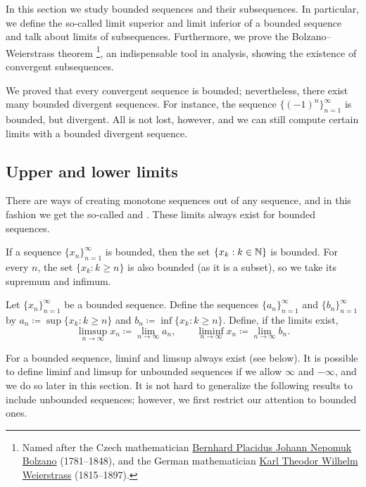 In this section we study bounded sequences and their subsequences.
In particular, we define the so-called limit superior and limit inferior
of a bounded sequence and talk about limits of subsequences.
Furthermore, we prove the
Bolzano--Weierstrass theorem%
\footnote{%
Named after the Czech mathematician
\href{https://en.wikipedia.org/wiki/Bernard_Bolzano}{Bernhard Placidus Johann Nepomuk Bolzano}
(1781--1848), and the German mathematician
\href{https://en.wikipedia.org/wiki/Karl_Weierstrass}{Karl Theodor Wilhelm Weierstrass}
(1815--1897).}, an
indispensable tool in analysis, showing the existence of convergent
subsequences.

We proved that every convergent sequence is bounded; nevertheless,
there exist many bounded divergent sequences.  For instance,
the sequence $\bigl\{ {(-1)}^n \bigr\}_{n=1}^\infty$ is bounded,
but divergent.  All is not lost, however, and we can
still compute certain limits with a bounded divergent sequence.

\subsection{Upper and lower limits}

There are ways of creating monotone sequences out of any sequence, and
in this fashion we
get the so-called \emph{} and
\emph{}.  These limits always exist for bounded
sequences.

If a sequence $\{ x_n \}_{n=1}^\infty$ is bounded, then 
the set $\{ x_k : k \in {\mathbb{N}} \}$ is bounded.  For every $n$,
the set $\{ x_k : k \geq n \}$ is also bounded (as it is a subset), so we
take its supremum and infimum.

\begin{defn} \label{liminflimsup:def}
Let $\{ x_n \}_{n=1}^\infty$ be a bounded sequence.  Define the sequences
$\{ a_n \}_{n=1}^\infty$
and $\{ b_n \}_{n=1}^\infty$ by
$a_n \coloneqq \sup \{ x_k : k \geq n \}$ and
$b_n \coloneqq \inf \{ x_k : k \geq n \}$.  
Define, if the limits exist,
\begin{equation*}
\limsup_{n \to \infty} x_n \coloneqq \lim_{n \to \infty} a_n ,
\qquad
\liminf_{n \to \infty} x_n \coloneqq \lim_{n \to \infty} b_n .
\end{equation*}
\end{defn}

For a bounded sequence, liminf and limsup always exist (see below).  It is possible
to define liminf and limsup for unbounded sequences if we allow $\infty$
and $-\infty$, and we do so later in this section.
It is not hard to generalize the following results to
include unbounded sequences; however, we first restrict our attention to
bounded ones.

